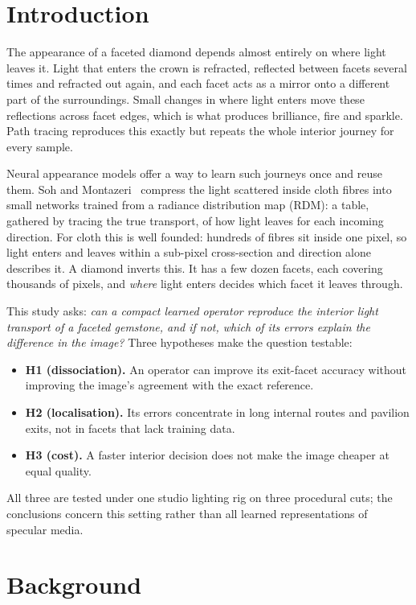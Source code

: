 \documentclass[conference]{IEEEtran}
\begin{document}
\section{Introduction}
The appearance of a faceted diamond depends almost entirely on where light
leaves it. Light that enters the crown is refracted, reflected between facets
several times and refracted out again, and each facet acts as a mirror onto a
different part of the surroundings. Small changes in where light enters move
these reflections across facet edges, which is what produces brilliance, fire
and sparkle. Path tracing reproduces this exactly but repeats the whole
interior journey for every sample.

Neural appearance models offer a way to learn such journeys once and reuse
them. Soh and Montazeri~\cite{soh2024} compress the light scattered inside
cloth fibres into small networks trained from a radiance distribution map
(RDM): a table, gathered by tracing the true transport, of how light leaves for
each incoming direction. For cloth this is well founded: hundreds of fibres sit
inside one pixel, so light enters and leaves within a sub-pixel cross-section
and direction alone describes it. A diamond inverts this. It has a few dozen
facets, each covering thousands of pixels, and \emph{where} light enters
decides which facet it leaves through.

This study asks: \emph{can a compact learned operator reproduce the interior
light transport of a faceted gemstone, and if not, which of its errors explain
the difference in the image?} Three hypotheses make the question testable:
\begin{itemize}
\item \textbf{H1 (dissociation).} An operator can improve its exit-facet
accuracy without improving the image's agreement with the exact reference.
\item \textbf{H2 (localisation).} Its errors concentrate in long internal
routes and pavilion exits, not in facets that lack training data.
\item \textbf{H3 (cost).} A faster interior decision does not make the image
cheaper at equal quality.
\end{itemize}
All three are tested under one studio lighting rig on three procedural cuts;
the conclusions concern this setting rather than all learned representations of
specular media.

\section{Background}
\end{document}
